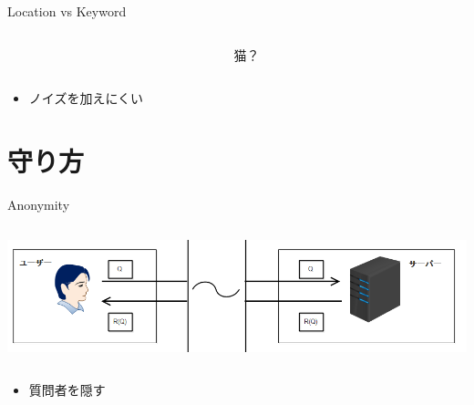 \documentclass[14pt,xcolor=dvipsnames,table,dvipdfmx]{beamer}
\begin{document}
\begin{frame}{Location vs Keyword}
\begin{columns}[c]
\begin{column}{0.3\textwidth}
		\end{column}
		\begin{column}{0.3\textwidth} %
		\begin{center}
			猫？
		\end{center}
		\end{column}
	\end{columns}
    \begin{block}{}
    \begin{itemize}
		\item ノイズを加えにくい
    \end{itemize}
    \end{block}
\end{frame}

\section{守り方}
	\begin{frame}{Anonymity}
	\begin{columns}[t]
		\begin{column}{0.8\textwidth} %
			\includegraphics[width=\columnwidth]{photo2.png}
		\end{column}
	\end{columns}

    \begin{block}{}
    \begin{itemize}
		\item 質問者を隠す
    \end{itemize}
    \end{block}
\end{frame}
\end{document}
